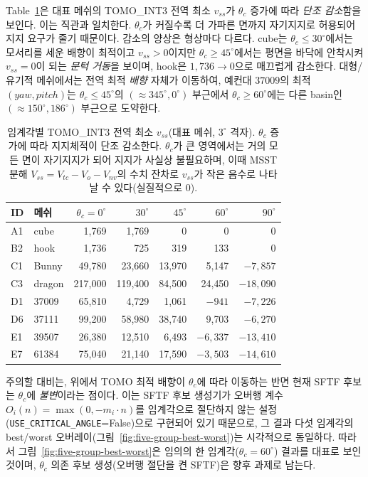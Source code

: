 \documentclass[11pt,a4paper]{article}
\begin{document}
Table~\ref{tab:critangle}은 대표 메쉬의 TOMO\_INT3 전역 최소 $v_{ss}$가 $\theta_c$ 증가에 따라
\emph{단조 감소}함을 보인다.
이는 직관과 일치한다. $\theta_c$가 커질수록 더 가파른 면까지 자기지지로 허용되어 지지 요구가 줄기 때문이다.
감소의 양상은 형상마다 다르다.
cube는 $\theta_c\le30^\circ$에서는 모서리를 세운 배향이 최적이고 $v_{ss}>0$이지만
$\theta_c\ge45^\circ$에서는 평면을 바닥에 안착시켜 $v_{ss}=0$이 되는 \emph{문턱 거동}을 보이며,
hook은 $1{,}736\to0$으로 매끄럽게 감소한다.
대형/유기적 메쉬에서는 전역 최적 \emph{배향} 자체가 이동하여,
예컨대 $37009$의 최적 $(yaw,pitch)$는 $\theta_c\le45^\circ$의 $(\approx\!345^\circ,0^\circ)$ 부근에서
$\theta_c\ge60^\circ$에는 다른 basin인 $(\approx\!150^\circ,186^\circ)$ 부근으로 도약한다.

\begin{table}[H]
\footnotesize
\centering
\caption{임계각별 TOMO\_INT3 전역 최소 $v_{ss}$(대표 메쉬, $3^\circ$ 격자).
$\theta_c$ 증가에 따라 지지체적이 단조 감소한다.
$\theta_c$가 큰 영역에서는 거의 모든 면이 자기지지가 되어 지지가 사실상 불필요하며,
이때 MSST 분해 $V_{ss}=V_{tc}-V_o-V_{nv}$의 수치 잔차로 $v_{ss}$가 작은 음수로 나타날 수 있다(실질적으로 $0$).}
\label{tab:critangle}
\begin{tabular}{llrrrrr}
\toprule
ID & 메쉬 & $\theta_c{=}0^\circ$ & $30^\circ$ & $45^\circ$ & $60^\circ$ & $90^\circ$\\
\midrule
A1 & cube   & 1{,}769   & 1{,}769   & 0        & 0         & 0\\
B2 & hook   & 1{,}736   & 725       & 319      & 133       & 0\\
C1 & Bunny  & 49{,}780  & 23{,}660  & 13{,}970 & 5{,}147   & $-7{,}857$\\
C3 & dragon & 217{,}000 & 119{,}400 & 84{,}500 & 24{,}450  & $-18{,}090$\\
D1 & 37009  & 65{,}810  & 4{,}729   & 1{,}061  & $-941$    & $-7{,}226$\\
D6 & 37111  & 99{,}200  & 58{,}980  & 38{,}740 & 9{,}703   & $-6{,}270$\\
E1 & 39507  & 26{,}380  & 12{,}510  & 6{,}493  & $-6{,}337$ & $-13{,}410$\\
E7 & 61384  & 75{,}040  & 21{,}140  & 17{,}590 & $-3{,}503$ & $-14{,}610$\\
\bottomrule
\end{tabular}
\end{table}

주의할 대비는, 위에서 TOMO 최적 배향이 $\theta_c$에 따라 이동하는 반면
현재 SFTF 후보는 $\theta_c$에 \emph{불변}이라는 점이다.
이는 SFTF 후보 생성기가 오버행 계수 $O_i(n)=\max(0,-m_i\cdot n)$를 임계각으로 절단하지 않는
설정(\texttt{USE\_CRITICAL\_ANGLE}=False)으로 구현되어 있기 때문으로,
그 결과 다섯 임계각의 best/worst 오버레이(그림~\ref{fig:five-group-best-worst})는 시각적으로 동일하다.
따라서 그림~\ref{fig:five-group-best-worst}은 임의의 한 임계각($\theta_c=60^\circ$) 결과를 대표로 보인 것이며,
$\theta_c$ 의존 후보 생성(오버행 절단을 켠 SFTF)은 향후 과제로 남는다.
\end{document}
